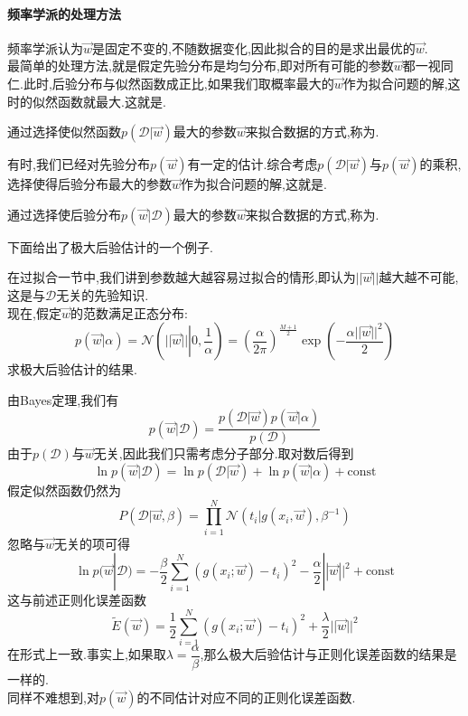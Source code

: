 \documentclass{ctexart}
\begin{document}
\paragraph{频率学派的处理方法}
频率学派认为$\vec{w}$是固定不变的,不随数据变化,因此拟合的目的是求出最优的$\vec{w}$.\\
\indent 最简单的处理方法,就是假定先验分布是均匀分布,即对所有可能的参数$\vec{w}$都一视同仁.此时,后验分布与似然函数成正比,如果我们取概率最大的$\vec{w}$作为拟合问题的解,这时的似然函数就最大.这就是.
\begin{definition}[极大似然估计]
    通过选择使似然函数$p\left(\mathcal{D}|\vec{w}\right)$最大的参数$\vec{w}$来拟合数据的方式,称为.
\end{definition}
\indent 有时,我们已经对先验分布$p(\vec{w})$有一定的估计.综合考虑$p(\mathcal{D}|\vec{w})$与$p(\vec{w})$的乘积,选择使得后验分布最大的参数$\vec{w}$作为拟合问题的解,这就是.
\begin{definition}[极大后验估计]
    通过选择使后验分布$p\left(\vec{w}|\mathcal{D}\right)$最大的参数$\vec{w}$来拟合数据的方式,称为.
\end{definition}
下面给出了极大后验估计的一个例子.
\begin{problem}
    在过拟合一节中,我们讲到参数越大越容易过拟合的情形,即认为$||\vec{w}||$越大越不可能,这是与$\mathcal{D}$无关的先验知识.\\
    现在,假定$\vec{w}$的范数满足正态分布:
    \[p\left(\vec{w}|\alpha\right)=\mathcal{N}\left(||\vec{w}||\left|0,\frac{1}{\alpha}\right.\right)=\left(\dfrac{\alpha}{2\pi}\right)^{\frac{M+1}{2}}\exp\left(-\dfrac{\alpha||\vec{w}||^2}{2}\right)\]
    求极大后验估计的结果.
\end{problem}
\begin{solution}
    由Bayes定理,我们有
    \[p(\vec{w}|\mathcal{D})=\dfrac{p(\mathcal{D}|\vec{w})p(\vec{w}|\alpha)}{p(\mathcal{D})}\]
    由于$p(\mathcal{D})$与$\vec{w}$无关,因此我们只需考虑分子部分.取对数后得到
    \[\ln p(\vec{w}|\mathcal{D})=\ln p(\mathcal{D}|\vec{w})+\ln p(\vec{w}|\alpha)+\text{const}\]
    假定似然函数仍然为
    \[P\left(\mathcal{D}|\vec{w},\beta\right)=\prod_{i=1}^{N}\mathcal{N}\left(t_i|g\left(x_i,\vec{w}\right),\beta^{-1}\right)\]
    忽略与$\vec{w}$无关的项可得
    \[\ln p(\vec{w}|\mathcal{D})=-\dfrac{\beta}{2}\sum_{i=1}^{N}\left(g\left(x_i;\vec{w}\right)-t_i\right)^2-\dfrac{\alpha}{2}||\vec{w}||^2+\text{const}\]
    这与前述正则化误差函数
    \[\tilde{E}(\vec{w})=\dfrac12\sum_{i=1}^{N}\left(g(x_i;\vec{w})-t_i\right)^2+\dfrac{\lambda}{2}||\vec{w}||^2\]
    在形式上一致.事实上,如果取$\lambda=\dfrac{\alpha}{\beta}$,那么极大后验估计与正则化误差函数的结果是一样的.\\
    \indent 同样不难想到,对$p(\vec{w})$的不同估计对应不同的正则化误差函数.
\end{solution}
\end{document}
